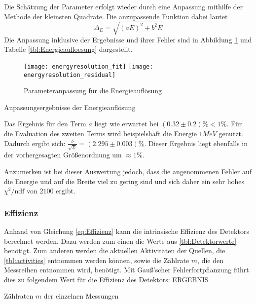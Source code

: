 \documentclass{../Misc/MontavonLaTeX/Montavon}
\newcommand{\halfwidth}{0.48\textwidth}
\begin{document}
Die Schätzung der Parameter erfolgt wieder durch eine Anpassung mithilfe der Methode der kleinsten Quadrate. Die anzupassende Funktion dabei lautet 
\[
	\Delta_E = \sqrt{\left(a E\right)^2 + b^2 E}
\]
Die Anpassung inklusive der Ergebnisse und ihrer Fehler sind in Abbildung \ref{fig:Energieaufloesung} und Tabelle \ref{tbl:Energieaufloesung} dargestellt.

\begin{figure}[htbp]
\texttt{[image: energyresolution\_fit]}
\texttt{[image: energyresolution\_residual]}
\caption{Parameteranpassung für die Energieauflösung}
\label{fig:Energieaufloesung}
\end{figure}

\begin{table}[htbp]
\centering

\caption{Anpassungsergebnisse der Energieauflösung}
\label{tbl:Energieauflösung}
\end{table}

Das Ergebnis für den Term $a$ liegt wie erwartet bei $(0.32 \pm 0.2) \unit{\%} < 1 \unit{\%}$.
Für die Evaluation des zweiten Terms wird beispielshaft die Energie $1 \unit{MeV}$ genutzt. Dadurch ergibt sich: $\frac{b}{\sqrt{E}} = (2.295 \pm 0.003) \unit{\%}$. Dieser Ergebnis liegt ebenfalls in der vorhergesagten Größenordnung um $\approx 1 \unit{\%}$. 

Anzumerken ist bei dieser Auswertung jedoch, dass die angenommenen Fehler auf die Energie und auf die Breite viel zu gering sind und sich daher ein sehr hohes $\chi^2 / \textrm{ndf}$ von $2100$ ergibt.

\subsubsection{Effizienz}
Anhand von Gleichung \ref{eq:Effizienz} kann die intrinsische Effizienz des Detektors berechnet werden. Dazu werden zum einen die Werte aus \ref{tbl:Detektorwerte} benötigt. Zum anderen werden die aktuellen Aktivitäten der Quellen, die \ref{tbl:activities} entnommen werden können, sowie die Zählrate $m$, die den Messreihen entnommen wird, benötigt. Mit Gauß'scher Fehlerfortpflanzung führt dies zu folgendem Wert für die Effizienz des Detektors: 
ERGEBNIS

\begin{table}[htbp]
\centering

\caption{Zählraten $m$ der einzelnen Messungen}
\label{tbl:Zaehlraten}
\end{table}
 
\end{document}
